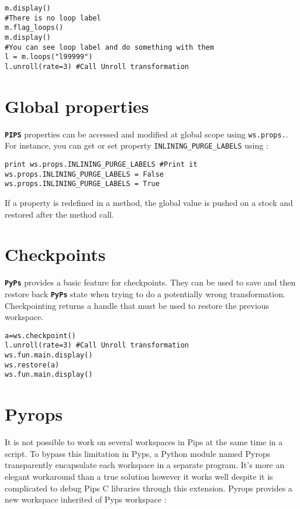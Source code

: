 \documentclass[a4paper]{article}
\newcommand{\PIPS}{\textbf{\texttt{PIPS}}}
\newcommand{\PYPS}{\textbf{\texttt{PyPs}}}
\begin{document}
\begin{lstlisting}
m.display()
#There is no loop label
m.flag_loops()
m.display()
#You can see loop label and do something with them
l = m.loops("l99999")
l.unroll(rate=3) #Call Unroll transformation
\end{lstlisting}

\section{Global properties}

\PIPS{} properties can be accessed and modified at global scope using \lstinline|ws.props.|.
For instance, you can get or set property \texttt{INLINING\_PURGE\_LABELS} using :

\begin{lstlisting}
print ws.props.INLINING_PURGE_LABELS #Print it
ws.props.INLINING_PURGE_LABELS = False
ws.props.INLINING_PURGE_LABELS = True
\end{lstlisting}

If a property is redefined in a method, the global value is pushed on a stock and restored after the method call.

\section{Checkpoints}

\PYPS{} provides a basic feature for checkpoints.
They can be used to save and then restore back \PYPS{} state when trying to do a potentially wrong transformation. 
Checkpointing returns a handle that must be used to restore the previous workspace.

\begin{lstlisting}
a=ws.checkpoint()
l.unroll(rate=3) #Call Unroll transformation
ws.fun.main.display()
ws.restore(a)
ws.fun.main.display()
\end{lstlisting}

\section{Pyrops}
It is not possible to work on several workspaces in Pips at the same time in a script.
To bypass this limitation in Pyps, a Python module named Pyrops transparently encapsulate each workspace in a separate program.
It’s more an elegant workaround than a true solution however it works well despite it is complicated to debug Pips C libraries through this extension.
Pyrops provides a new workspace inherited of Pyps workspace :
\end{document}
